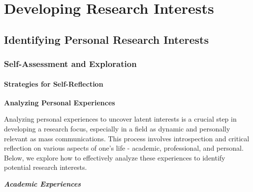\documentclass[
]{book}
\begin{document}
\hypertarget{developing-research-interests}{%
\chapter{Developing Research Interests}\label{developing-research-interests}}

\hypertarget{identifying-personal-research-interests}{%
\section*{Identifying Personal Research Interests}\label{identifying-personal-research-interests}}

\hypertarget{self-assessment-and-exploration}{%
\subsection*{Self-Assessment and Exploration}\label{self-assessment-and-exploration}}

\hypertarget{strategies-for-self-reflection}{%
\subsubsection*{Strategies for Self-Reflection}\label{strategies-for-self-reflection}}

\textbf{Analyzing Personal Experiences}

Analyzing personal experiences to uncover latent interests is a crucial step in developing a research focus, especially in a field as dynamic and personally relevant as mass communications. This process involves introspection and critical reflection on various aspects of one's life - academic, professional, and personal. Below, we explore how to effectively analyze these experiences to identify potential research interests.

\textbf{\emph{Academic Experiences}}
\end{document}
